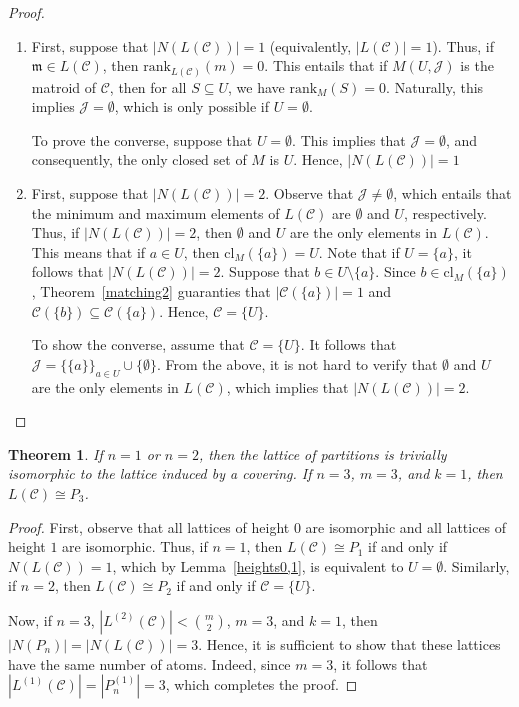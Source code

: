 \documentclass{article}
\newtheorem{theorem}{Theorem}[section]
\begin{document}
\begin{proof}

    \begin{enumerate}
        \item First, suppose that $|N(L(\mathcal{C}))|=1$ (equivalently, $|L(\mathcal{C})|=1$). Thus, if $\mathfrak{m}\in L(\mathcal{C})$, then $\text{rank}_{L(\mathcal{C})}(m)=0$. This entails that if $M(U, \mathcal{J})$ is the matroid of $\mathcal{C}$, then for all $S\subseteq U$, we have $\text{rank}_M(S)=0$. Naturally, this implies $\mathcal{J}=\emptyset$, which is only possible if $U = \emptyset$.

        To prove the converse, suppose that $U = \emptyset$. This implies that $\mathcal{J}=\emptyset$, and consequently, the only closed set of $M$ is $U$. Hence, $|N(L(\mathcal{C}))|=1$
        \item First, suppose that $|N(L(\mathcal{C}))|=2$. Observe that $\mathcal{J}\neq \emptyset$, which entails that the minimum and maximum elements of $L(\mathcal{C})$ are $\emptyset$ and $U$, respectively. Thus, if $|N(L(\mathcal{C}))|=2$, then $\emptyset$ and $U$ are the only elements in $L(\mathcal{C})$. This means that if $a \in U$, then $\text{cl}_M(\{a\})=U$. Note that if $U=\{a\}$, it follows that $|N(L(\mathcal{C}))|=2$. Suppose that $b\in U\setminus\{a\}$. Since $b \in \text{cl}_M(\{a\})$, Theorem~\ref{matching2} guaranties that $|\mathcal{C}(\{a\})|=1$ and $ \mathcal{C}(\{b\})\subseteq \mathcal{C}(\{a\})$. Hence, $\mathcal{C} = \{U\}$.

        To show the converse, assume that $\mathcal{C} = \{U\}$. It follows that $\mathcal{J}= \{\{a\}\}_{a\in U}\cup\{\emptyset\}$. From the above, it is not hard to verify that $\emptyset$ and $U$ are the only elements in $L(\mathcal{C})$, which implies that $|N(L(\mathcal{C}))|=2$.
    \end{enumerate}
    
\end{proof}


\begin{theorem}\label{thm:Pn-sufficient}
    If $n=1$ or $n=2$, then the lattice of partitions is trivially isomorphic to the lattice induced by a covering. If $n=3$, $m=3$, and $k=1$, then $L(\mathcal{C})\cong P_3$.
\end{theorem}

\begin{proof}
     First, observe that all lattices of height  $0$ are isomorphic and all lattices of height  $1$  are isomorphic. Thus, if $n=1$, then $L(\mathcal{C})\cong P_1$ if and only if $N(L(\mathcal{C}))=1$, which by Lemma~\ref{heights0,1}, is equivalent to $U = \emptyset$. Similarly, if $n=2$, then $L(\mathcal{C})\cong P_2$ if and only if $\mathcal{C}=\{U\}$.
     
     Now, if $n=3$, $|L^{(2)}(\mathcal{C})| < \binom{m}{2}$, $m=3$, and $k=1$, then \( |N(P_n)| = |N(L(\mathcal{C}))| = 3 \). Hence, it is sufficient to show that these lattices have the same number of atoms. Indeed, since \( m=3 \), it follows that \( |L^{(1)}(\mathcal{C})|=|P_n^{(1)}|=3 \), which completes the proof.
\end{proof}
\end{document}
